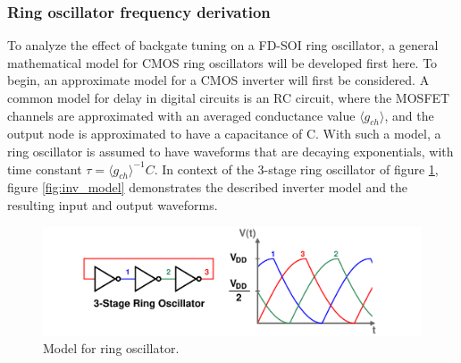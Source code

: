 	\FloatBarrier


	\subsubsection{Ring oscillator frequency derivation}\label{eq:freq_deriv}
		To analyze the effect of backgate tuning on a FD-SOI ring oscillator, a general mathematical model for CMOS ring oscillators will be developed first here. To begin, an approximate model for a CMOS inverter will first be considered. A common model for delay in digital circuits is an RC circuit, where the MOSFET channels are approximated with an averaged conductance value $\langle g_{ch} \rangle$, and the output node is approximated to have a capacitance of C. With such a model, a ring oscillator is assumed to have waveforms that are decaying exponentials, with time constant $\tau = \langle g_{ch} \rangle^{-1}C$. In context of the 3-stage ring oscillator of figure \ref{fig:rosc_rc}, figure \ref{fig:inv_model} demonstrates the described inverter model and the resulting input and output waveforms.

		\begin{figure}[htb!]
			\center\includegraphics[width=0.8\linewidth, angle=0]{figs/theory/osc_waves}
			\caption{Model for ring oscillator.}
			\label{fig:rosc_rc}
		\end{figure}

